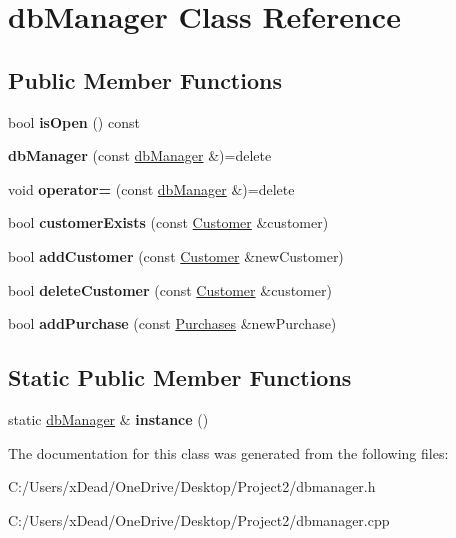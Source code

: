 \hypertarget{classdb_manager}{}\section{db\+Manager Class Reference}
\label{classdb_manager}
\subsection*{Public Member Functions}
\begin{DoxyCompactItemize}
\item 
\mbox{\label{classdb_manager_af72b6c137c35eb6b65f0a8082214e00a}} 
bool {\bfseries is\+Open} () const
\item 
\mbox{\label{classdb_manager_aa29c1c97044f4682191b27178fb0bc16}} 
{\bfseries db\+Manager} (const \mbox{\hyperlink{classdb_manager}{db\+Manager}} \&)=delete
\item 
\mbox{\label{classdb_manager_aa10203218ffdde8956db859348dfc83f}} 
void {\bfseries operator=} (const \mbox{\hyperlink{classdb_manager}{db\+Manager}} \&)=delete
\item 
\mbox{\label{classdb_manager_ae058bb3596b9f9d38c6b70957dfa1733}} 
bool {\bfseries customer\+Exists} (const \mbox{\hyperlink{class_customer}{Customer}} \&customer)
\item 
\mbox{\label{classdb_manager_aea784d49fd19376a52b51ce6d3517936}} 
bool {\bfseries add\+Customer} (const \mbox{\hyperlink{class_customer}{Customer}} \&new\+Customer)
\item 
\mbox{\label{classdb_manager_a811b932e2ef4b109b6f38315fb20893f}} 
bool {\bfseries delete\+Customer} (const \mbox{\hyperlink{class_customer}{Customer}} \&customer)
\item 
\mbox{\label{classdb_manager_af60293546bcf6e584f3b13867f544381}} 
bool {\bfseries add\+Purchase} (const \mbox{\hyperlink{class_purchases}{Purchases}} \&new\+Purchase)
\end{DoxyCompactItemize}
\subsection*{Static Public Member Functions}
\begin{DoxyCompactItemize}
\item 
\mbox{\label{classdb_manager_aca1b877120d3e7b7391d66973b3badb0}} 
static \mbox{\hyperlink{classdb_manager}{db\+Manager}} \& {\bfseries instance} ()
\end{DoxyCompactItemize}


The documentation for this class was generated from the following files\+:\begin{DoxyCompactItemize}
\item 
C\+:/\+Users/x\+Dead/\+One\+Drive/\+Desktop/\+Project2/dbmanager.\+h\item 
C\+:/\+Users/x\+Dead/\+One\+Drive/\+Desktop/\+Project2/dbmanager.\+cpp\end{DoxyCompactItemize}
